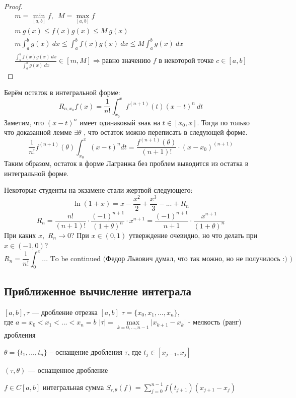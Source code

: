 \newpage 
\begin{proof}
    \[
        \begin{gathered}
            m = \min_{[a, b]} f, \,\,\, M = \max_{[a, b]} f\\
            m\ g(x) \leqslant f(x) g(x) \leqslant M\ g(x)\\
            m \int_a^b g(x)\ dx \leqslant \int_a^b f(x) g(x)\ dx \leqslant M \int_a^b g(x)\ dx\\
            \frac{\int_a^b f(x) g(x)\ dx}{\int_a^b g(x)\ dx} \in [m, M] \Rightarrow 
            \text{равно значению $f$ в некоторой точке $c\in [a,b]$}
        \end{gathered}
    \]
\end{proof}
\begin{follow}
        
    Берём остаток в интегральной форме:
    \[
        R_{n, x_0} f(x) = \frac{1}{n!} \int_{x_0}^x f^{(n + 1)}(t) (x - t) ^ n\ dt
    \]
    Заметим, что $(x - t)^n$ имеет одинаковый знак на $t\in [x_0, x]$. Тогда по только что доказанной лемме $\exists \theta$
    , что остаток можно переписать в следующей форме.
    \[
        \frac{1}{n!} f^{(n + 1)} (\theta) \int_{x_0}^x (x - t) ^ n dt = \frac{f^{(n + 1)}(\theta)}{(n + 1)!}  \cdot (x - x_0) ^ {(n + 1)}
    \]
    Таким образом, остаток в форме Лагранжа без проблем выводится из остатка в интегральной форме.
\end{follow}

\begin{remark}
    Некоторые студенты на экзамене стали жертвой следующего:
    \[
        \ln{(1+x)} = x - \frac{x ^ 2}{2} + \frac{x ^ 3}{3} - ... + R_n
    \]
    \[
        R_n = \frac{n!}{(n + 1)!} \cdot \frac{(-1) ^ {n + 1}}{(1 + \theta) ^ n} \cdot x^{n + 1} = \frac{(-1) ^ {n + 1}}{n + 1} \cdot \frac{x ^ {n + 1}}{(1 + \theta) ^ n}
    \]
    \quad 
    При каких $x$,\, $R_n \to 0$?
    При $x \in (0, 1)$ утверждение очевидно, но что делать при $x \in (-1, 0)$?
    \[
        R_n = \frac{1}{n!} \int_0^x ... \text{ To be continued (Федор Львович думал, что так можно, но не получилось :) )}
    \]
\end{remark}
\newpage 

\subsection{Приближенное вычисление интеграла}

\begin{definition}
    $[a, b], \tau $ --- дробление отрезка $[a, b]$ $\tau = \{ x_0, x_1, \ldots, x_n \}$, \\
    где $a = x_0 < x_1 < \ldots < x_n = b$ \quad $|\tau|
    = \max\limits_{k = 0, \ldots, n - 1} \lvert x_{k + 1} - x_k \rvert$ - мелкость (ранг) дробления

    $\theta = \{ t_1, \ldots, t_n\}$ -- оснащение дробления $\tau$, где $t_j \in [x_{j - 1}, x_j]$

    $(\tau, \theta) $ --- оснащенное дробление

    $f \in C[a, b]$ интегральная сумма $S_{\tau, \theta} (f) = \sum\limits_{j = 0}^{n - 1} f(t_{j + 1}) (x_{j + 1} - x_j)$
\end{definition}

